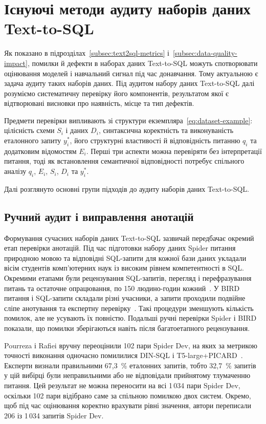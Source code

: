 \documentclass[a4paper,14pt,oneside]{extreport}
\begin{document}
\section{Існуючі методи аудиту наборів даних Text-to-SQL}
\label{sec:annotation-audit}

Як показано в підрозділах~\ref{subsec:text2sql-metrics} і~\ref{subsec:data-quality-impact}, помилки й дефекти в наборах даних Text-to-SQL можуть спотворювати оцінювання моделей і навчальний сигнал під час донавчання. Тому актуальною є задача аудиту таких наборів даних. Під аудитом набору даних Text-to-SQL далі розуміємо систематичну перевірку його компонентів, результатом якої є відтворювані висновки про наявність, місце та тип дефектів.

Предмети перевірки випливають зі структури екземпляра~\eqref{eq:dataset-example}: цілісність схеми \(S_i\) і даних \(D_i\), синтаксична коректність та виконуваність еталонного запиту \(y_i^*\), його структурні властивості й відповідність питанню \(q_i\) та додатковим відомостям \(E_i\). Перші три аспекти можна перевіряти без інтерпретації питання, тоді як встановлення семантичної відповідності потребує спільного аналізу \(q_i\), \(E_i\), \(S_i\), \(D_i\) та \(y_i^*\).

Далі розглянуто основні групи підходів до аудиту наборів даних Text-to-SQL.

\subsection{Ручний аудит і виправлення анотацій}
\label{subsec:manual-audit}

Формування сучасних наборів даних Text-to-SQL зазвичай передбачає окремий етап перевірки анотацій. Під час підготовки набору даних Spider питання природною мовою та відповідні SQL-запити для кожної бази даних укладали вісім студентів комп'ютерних наук із високим рівнем компетентності в SQL. Окремими етапами були рецензування SQL-запитів, перегляд і перефразування питань та остаточне опрацювання, по 150 людино-годин кожний~\cite{yu2018spider}. У BIRD питання і SQL-запити складали різні учасники, а запити проходили подвійне сліпе анотування та експертну перевірку~\cite{li2023bird}. Такі процедури зменшують кількість помилок, але не усувають їх повністю. Подальші ручні перевірки Spider і BIRD показали, що помилки зберігаються навіть після багатоетапного рецензування.

Pourreza і Rafiei вручну переоцінили 102 пари Spider Dev, на яких за метрикою точності виконання одночасно помилилися DIN-SQL і T5-large+PICARD~\cite{pourreza2023evaluating}. Експерти визнали правильними 67,3~\% еталонних запитів, тобто 32,7~\% запитів у цій вибірці були неправильними або не відповідали прийнятому тлумаченню питання. Цей результат не можна переносити на всі 1\,034 пари Spider Dev, оскільки 102 пари відібрано саме за спільною помилкою двох систем. Окремо, щоб під час оцінювання коректно врахувати рівні значення, автори переписали 206 із 1\,034 запитів Spider Dev.
\end{document}
